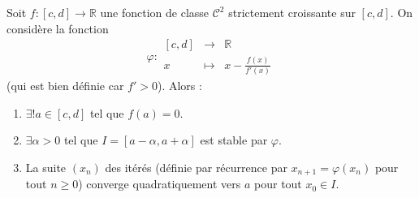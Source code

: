 






  \begin{theorem}
    Soit $f : [c, d] \rightarrow \mathbb{R}$ une fonction de classe $\mathcal{C}^2$ strictement croissante sur $[c, d]$. On considère la fonction
    \[ \varphi :
    \begin{array}{ccc}
      [c, d] &\rightarrow& \mathbb{R} \\
      x &\mapsto& x - \frac{f(x)}{f'(x)}
    \end{array}
    \]
    (qui est bien définie car $f' > 0$). Alors :
    \begin{enumerate}[label=(\roman*)]
      \item $\exists! a \in [c, d]$ tel que $f(a) = 0$.
      \item $\exists \alpha > 0$ tel que $I = [a - \alpha, a + \alpha]$ est stable par $\varphi$.
      \item La suite $(x_n)$ des itérés (définie par récurrence par $x_{n+1} = \varphi(x_n)$ pour tout $n \geq 0$) converge quadratiquement vers $a$ pour tout $x_0 \in I$.
    \end{enumerate}
  \end{theorem}

